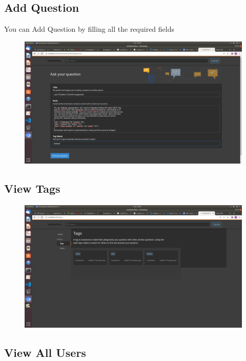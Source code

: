 \documentclass[12pt]{article}
\begin{document}
\subsection{Add Question}
You can Add Question by filling all the required fields\\


\begin{figure}[H]
\begin{center}
\includegraphics[width=0.75\columnwidth]{Addquestion}
\end{center}
\end{figure}

\subsection{View Tags}

\begin{figure}[H]
\begin{center}
\includegraphics[width=0.75\columnwidth]{Tags}
\end{center}
\end{figure}

\subsection{View All Users}
\end{document}
